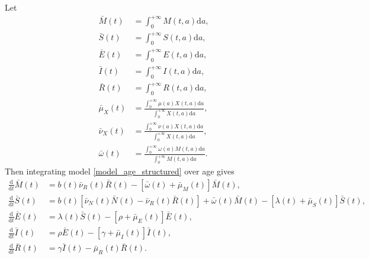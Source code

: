 \documentclass[USenglish]{article}
\newcommand{\md}{\mathrm{d}}
\begin{document}
Let
\begin{subequations}
  \begin{align}
    \bar{M}(t) &= \int_0^{+\infty} M(t, a) \md a,
    \\
    \bar{S}(t) &= \int_0^{+\infty} S(t, a) \md a,
    \\
    \bar{E}(t) &= \int_0^{+\infty} E(t, a) \md a,
    \\
    \bar{I}(t) &= \int_0^{+\infty} I(t, a) \md a,
    \\
    \bar{R}(t) &= \int_0^{+\infty} R(t, a) \md a,
    \\
    \bar{\mu}_X(t)
    &= \frac{\int_0^{+\infty} \mu(a) X(t, a) \md a}
    {\int_0^{+\infty} X(t, a) \md a},
    \\
    \bar{\nu}_X(t)
    &= \frac{\int_0^{+\infty} \nu(a) X(t, a) \md a}
    {\int_0^{+\infty} X(t, a) \md a},
    \\
    \bar{\omega}(t)
    &= \frac{\int_0^{+\infty} \omega(a) M(t, a) \md a}
      {\int_0^{+\infty} M(t, a) \md a}.
  \end{align}
\end{subequations}
Then integrating model \eqref{model_age_structured} over age gives
\begin{subequations}
  \label{model_age_structured_agg_age}
  \begin{align}
    \frac{\md}{\md t} \bar{M}(t)
    &= b(t) \bar{\nu}_R(t) \bar{R}(t)
    - \left[\bar{\omega}(t) + \bar{\mu}_M(t)\right] \bar{M}(t),
    \\
    \frac{\md}{\md t} \bar{S}(t)
    &= b(t) \left[
      \bar{\nu}_N(t) \bar{N}(t)
      - \bar{\nu}_R(t) \bar{R}(t)
    \right]
    + \bar{\omega}(t) \bar{M}(t)
    - \left[\lambda(t) + \bar{\mu}_S(t)\right] \bar{S}(t),
    \\
    \frac{\md}{\md t} \bar{E}(t)
    &= \lambda(t) \bar{S}(t)
    - \left[\rho + \bar{\mu}_E(t)\right] \bar{E}(t),
    \\
    \frac{\md}{\md t} \bar{I}(t)
    &= \rho \bar{E}(t)
    - \left[\gamma + \bar{\mu}_I(t)\right] \bar{I}(t),
    \\
    \frac{\md}{\md t} \bar{R}(t)
    &= \gamma \bar{I}(t)
    - \bar{\mu}_R(t) \bar{R}(t).
  \end{align}
\end{subequations}
\end{document}
